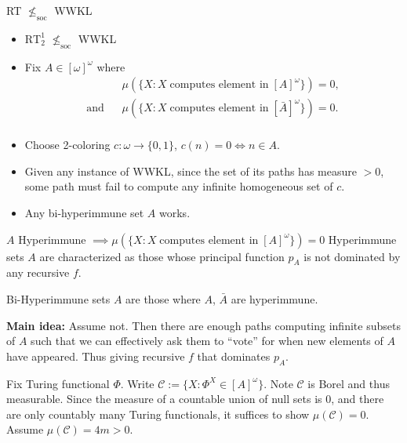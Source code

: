 \begin{frame}{RT $\nleq_{\text{soc}}$ WWKL}
  \begin{itemize}
    \item $\text{RT}_2^1$ $\nleq_{\text{soc}}$ WWKL
    \item Fix $A\in[\omega]^\omega$ where
      \begin{align*}
        &\mu(\{X: X\; \text{computes element in}\; [A]^\omega\}) =0,\\
        \text{and}\;\;\; &\mu(\{X: X\; \text{computes element in}\;
        [\bar{A}]^\omega\}) =0.\\
      \end{align*}
    \item Choose 2-coloring $c:\omega\rightarrow\{0,1\}$, $c(n)=0
      \Leftrightarrow n\in A$.
    \item Given any instance of WWKL, since the set of its paths has
      measure $>0$, some path must fail to compute any infinite
      homogeneous set of $c$. 
    \item Any bi-hyperimmune set $A$ works.
  \end{itemize}
\end{frame}

\begin{frame}{$A$ Hyperimmune $\implies \mu(\{X: X\; \text{computes
element in}\; [A]^\omega\}) =0$}
  Hyperimmune sets $A$ are characterized as those whose principal
  function $p_A$ is not dominated by any recursive $f$. \\
  \vspace{1em}

  Bi-Hyperimmune sets $A$ are those where $A$, $\bar{A}$ are hyperimmune.\\
  \vspace{1em}

  \textbf{Main idea:} Assume not. Then there are enough paths computing
  infinite subsets of $A$ such that we can effectively ask them to ``vote''
  for when new elements of $A$ have appeared. Thus giving recursive
  $f$ that dominates $p_A$.\\
  \vspace{1em}

  Fix Turing functional $\Phi$. Write $\mathcal{C} :=\{X:
  \Phi^X\in[A]^\omega\}$. Note $\mathcal{C}$ is Borel and thus measurable.
  Since the measure of a countable union of null sets is 0, and
  there are only countably many Turing functionals, it suffices to show
  $\mu(\mathcal{C})=0$. Assume $\mu(\mathcal{C})=4m>0$.
\end{frame}


